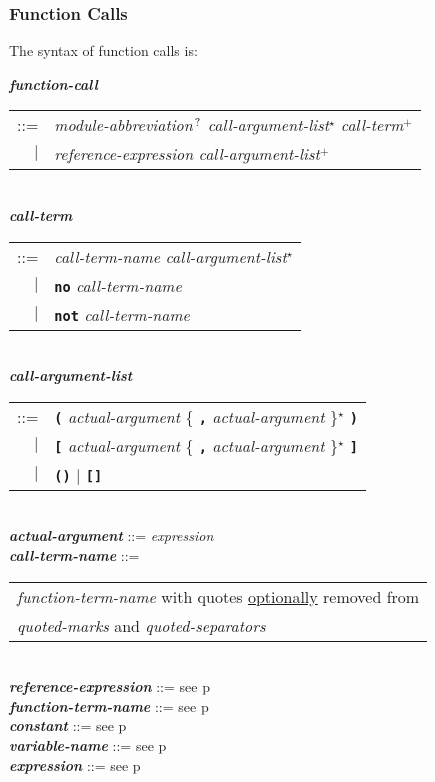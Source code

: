 \documentclass[12pt]{article}
\newcommand{\TT}[1]{{\tt \bfseries #1}}
\newcommand{\STAR}{{\Large $^\star$}}
\newcommand{\PLUS}[1][]{{$^{+#1}$}}
\newcommand{\QMARK}{{$^{\,\mbox{\footnotesize ?}}$}}
\newcommand{\ttkey}[1]{{\tt \bfseries #1}}
\newcommand{\emkey}[1]{{\em \bfseries #1}}
\newcommand{\pagref}[1]{p\pageref{#1}}
\newenvironment{indpar}[1][0.3in]%
	{\begin{list}{}%
		     {\setlength{\itemsep}{0in}%
		      \setlength{\topsep}{0in}%
		      \setlength{\parsep}{1ex}%
		      \setlength{\labelwidth}{#1}%
		      \setlength{\leftmargin}{#1}%
		      \addtolength{\leftmargin}{\labelsep}}%
	 \item}%
	{\end{list}}
\begin{document}
\subsubsection{Function Calls}
\label{FUNCTION-CALLS}

The syntax of function calls is:

\begin{indpar}
\emkey{function-call}\label{FUNCTION-CALL}
    \begin{tabular}[t]{rl}
    ::= & {\em module-abbreviation}\QMARK{}
          {\em call-argument-list}\STAR{}
          {\em call-term}\PLUS{} \\
    $|$ & {\em reference-expression}
          {\em call-argument-list}\PLUS{} \\
    \end{tabular}
\\[0.5ex]
\emkey{call-term}
    \begin{tabular}[t]{rl}
    ::= & {\em call-term-name} {\em call-argument-list}\STAR{} \\
    $|$ & \ttkey{no} {\em call-term-name} \\
    $|$ & \ttkey{not} {\em call-term-name} \\
    \end{tabular}
\\[0.5ex]
\emkey{call-argument-list}\label{CALL-ARGUMENT-LIST}
    \begin{tabular}[t]{rl}
    ::= & \TT{(} {\em actual-argument}
          \{ \TT{,} {\em actual-argument} \}\STAR{} \TT{)} \\
    $|$ & \TT{[} {\em actual-argument}
          \{ \TT{,} {\em actual-argument} \}\STAR{} \TT{]} \\
    $|$ & \TT{()} $|$ \TT{[]} \\
    \end{tabular}
\\[0.5ex]
\emkey{actual-argument} ::= {\em expression}
\\[0.5ex]
\emkey{call-term-name}\label{CALL-TERM-NAME} ::=
    \begin{tabular}[t]{@{}l}
    {\em function-term-name} with quotes \underline{optionally} removed from \\
    {\em quoted-marks} and {\em quoted-separators}
    \end{tabular}
\\[0.5ex]
\emkey{reference-expression} ::= see \pagref{REFERENCE-EXPRESSION}
\\[0.5ex]
\emkey{function-term-name} ::= see \pagref{FUNCTION-TERM-NAME}
\\[0.5ex]
\emkey{constant} ::= see \pagref{CONSTANTS}
\\[0.5ex]
\emkey{variable-name} ::= see \pagref{VARIABLE-NAME}
\\[0.5ex]
\emkey{expression} ::= see \pagref{EXPRESSION}
\end{indpar}
\end{document}
